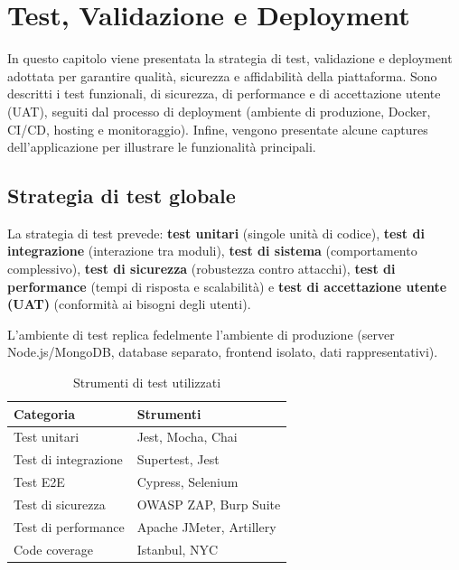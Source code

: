 \chapter{Test, Validazione e Deployment}
\label{chap:test-validazione-deployment}

In questo capitolo viene presentata la strategia di test, validazione e deployment adottata per garantire qualità, sicurezza e affidabilità della piattaforma. Sono descritti i test funzionali, di sicurezza, di performance e di accettazione utente (UAT), seguiti dal processo di deployment (ambiente di produzione, Docker, CI/CD, hosting e monitoraggio). Infine, vengono presentate alcune captures dell'applicazione per illustrare le funzionalità principali.

\section{Strategia di test globale}
\label{sec:strategia-test}

La strategia di test prevede: \textbf{test unitari} (singole unità di codice), \textbf{test di integrazione} (interazione tra moduli), \textbf{test di sistema} (comportamento complessivo), \textbf{test di sicurezza} (robustezza contro attacchi), \textbf{test di performance} (tempi di risposta e scalabilità) e \textbf{test di accettazione utente (UAT)} (conformità ai bisogni degli utenti).

L'ambiente di test replica fedelmente l'ambiente di produzione (server Node.js/MongoDB, database separato, frontend isolato, dati rappresentativi).

\begin{table}[H]
    \centering
    \caption{Strumenti di test utilizzati}
    \label{tab:strumenti-test}
    \renewcommand{\arraystretch}{1.3}
    \begin{tabular}{|p{4.5cm}|p{10cm}|}
        \hline
        \textbf{Categoria} & \textbf{Strumenti} \\
        \hline
        Test unitari & Jest, Mocha, Chai \\
        \hline
        Test di integrazione & Supertest, Jest \\
        \hline
        Test E2E & Cypress, Selenium \\
        \hline
        Test di sicurezza & OWASP ZAP, Burp Suite \\
        \hline
        Test di performance & Apache JMeter, Artillery \\
        \hline
        Code coverage & Istanbul, NYC \\
        \hline
    \end{tabular}
\end{table}

